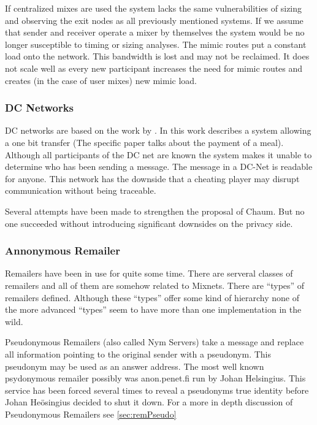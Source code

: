 If centralized mixes are used the system lacks the same vulnerabilities of sizing and observing the exit nodes as all previously mentioned systems. If we assume that sender and receiver operate a mixer by themselves the system would be no longer susceptible to timing or sizing analyses. The mimic routes put a constant load onto the network. This bandwidth is lost and may not be reclaimed. It does not scale well as every new participant increases the need for mimic routes and creates (in the case of user mixes) new mimic load.

\subsubsection{DC Networks}
DC networks are based on the work  by \citeauthor{chaum-dc}\cite{chaum-dc}. In this work \citeauthor{chaum-dc} describes a system allowing a one bit transfer (The specific paper talks about the payment of a meal). Although all participants of the DC net are known the system makes it unable to determine who has been sending a message. The message in a DC-Net is readable for anyone. This network has the downside that a cheating player may disrupt communication without being traceable.

Several attempts have been made to strengthen the proposal of Chaum\cite{golle:eurocrypt2004}\cite{disco}. But no one succeeded without introducing significant downsides on the privacy side.

\subsubsection{Annonymous Remailer\label{sec:remailer}}
Remailers have been in use for quite some time. There are serveral classes of remailers and all of them are somehow related to Mixnets. There are ``types'' of remailers defined. Although these ``types'' offer some kind of hierarchy none of the more advanced ``types'' seem to have more than one implementation in the wild. 


Pseudonymous Remailers (also called Nym Servers) take a message and replace all information pointing to the original sender with a pseudonym. This pseudonym may be used as an answer address. The most well known psydonymous remailer possibly was anon.penet.fi run by Johan Helsingius. This service has been forced several times to reveal a pseudonyms true identity before Johan Heösingius decided to shut it down. For a more in depth discussion of Pseudonymous Remailers see \ref{sec:remPseudo}


